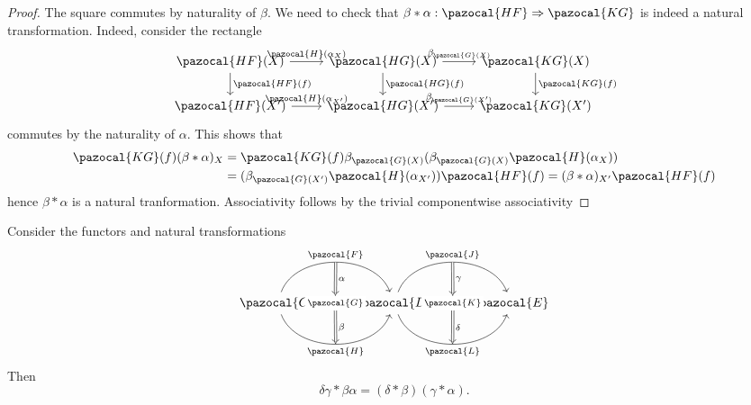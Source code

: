 \begin{proof}
    The square commutes by naturality of $\beta$. We need to check that $\beta\ast\alpha : \pazocal{HF} \Rightarrow \pazocal{KG}$ is indeed a natural transformation. Indeed, consider the rectangle 
    $$
        \begin{tikzcd}
            \pazocal{HF}(X) \arrow[d,"\pazocal{HF}(f)"]\arrow[r,"\pazocal{H}(\alpha_X)"] & \pazocal{HG}(X) \arrow[r,"\beta_{\pazocal{G}(X)}"] \arrow[d,"\pazocal{HG}(f)"] & \pazocal{KG}(X)\arrow[d,"\pazocal{KG}(f)"]\\
            \pazocal{HF}(X') \arrow[r,"\pazocal{H}(\alpha_{X'})"]& \pazocal{HG}(X') \arrow[r,"\beta_{\pazocal{G}(X')}"] & \pazocal{KG}(X')
        \end{tikzcd}
    $$ 
    commutes by the naturality of $\alpha$. This shows that 
    \begin{align*} 
        \pazocal{KG}(f)(\beta\ast\alpha)_X&=\pazocal{KG}(f)\beta_{\pazocal{G}(X)}(\beta_{\pazocal{G}(X)}\pazocal{H}(\alpha_X))\\
         &= (\beta_{\pazocal{G}(X')}\pazocal{H}(\alpha_{X'}))\pazocal{HF}(f)= (\beta\ast\alpha)_{X'}\pazocal{HF}(f)
    \end{align*}
    hence $\beta\ast \alpha$ is a natural tranformation. Associativity follows by the trivial componentwise associativity
\end{proof}
\begin{lemma}
    Consider the functors and natural transformations
    $$
        \begin{tikzcd}
            \pazocal{C} \arrow[r, bend left=70, "\pazocal{F}"{name=F}] \arrow[r, "\pazocal{G}"{name=G, description}]
            \arrow[r, bend right=70, "\pazocal{H}"{name=H,swap}] & \pazocal{D} \arrow[Rightarrow, from=F, to=G, "\alpha"]\arrow[Rightarrow,from=G, to=H, "\beta"] \arrow[r, bend left=70, "\pazocal{J}"{name=J}] \arrow[r, "\pazocal{K}"{name=K, description}]
            \arrow[r, bend right=70, "\pazocal{L}"{name=L,swap}] & \pazocal{E} \arrow[Rightarrow, from=J, to=K,"\gamma"]\arrow[Rightarrow, from=K, to=L, "\delta"]
        \end{tikzcd}
    $$
    Then 
    $$
        \delta\gamma \ast \beta\alpha = (\delta\ast \beta)(\gamma\ast \alpha).
    $$
\end{lemma}
